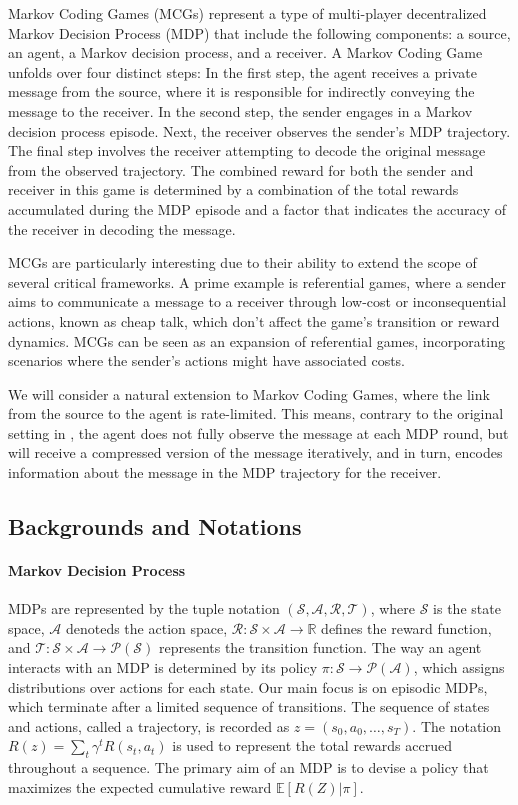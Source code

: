 Markov Coding Games (MCGs) \cite{sokota2022communicating} represent a type of multi-player decentralized Markov Decision Process (MDP) that include the following components: a source, an agent, a Markov decision process, and a receiver. A Markov Coding Game unfolds over four distinct steps:  In the first step, the agent receives a private message from the source, where it is responsible for indirectly conveying the message to the receiver. In the second step, the sender engages in a Markov decision process episode. Next, the receiver observes the sender’s MDP trajectory. The final step involves the receiver attempting to decode the original message from the observed trajectory. The combined reward for both the sender and receiver in this game is determined by a combination of the total rewards accumulated during the MDP episode and a factor that indicates the accuracy of the receiver in decoding the message.

MCGs are particularly interesting due to their ability to extend the scope of several critical frameworks. A prime example is referential games, where a sender aims to communicate a message to a receiver through low-cost or inconsequential actions, known as cheap talk, which don’t affect the game’s transition or reward dynamics. MCGs can be seen as an expansion of referential games, incorporating scenarios where the sender’s actions might have associated costs.

We will consider a natural extension to Markov Coding Games, where the link from the source to the agent is rate-limited. This means, contrary to the original setting in \cite{sokota2022communicating}, the agent does not fully observe the message at each MDP round, but will receive a compressed version of the message iteratively, and in turn, encodes information about the message in the MDP trajectory for the receiver.


\subsection{Backgrounds and Notations}
\paragraph{Markov Decision Process}  MDPs are represented by the tuple notation $(\mathcal{S}, \mathcal{A}, \mathcal{R}, \mathcal{T})$, where $\mathcal{S}$ is the state space, $\mathcal{A}$ denoteds the action space, $\mathcal{R}: \mathcal{S} \times \mathcal{A} \rightarrow \mathbb{R}$ defines the reward function, and $\mathcal{T}: \mathcal{S} \times \mathcal{A} \rightarrow \mathcal{P}(\mathcal{S})$ represents the transition function. The way an agent interacts with an MDP is determined by its policy $\pi: \mathcal{S} \rightarrow \mathcal{P}(\mathcal{A})$, which assigns distributions over actions for each state. Our main focus is on episodic MDPs, which terminate after a limited sequence of transitions. The sequence of states and actions, called a trajectory, is recorded as $z = (s_0, a_0, \ldots, s_T)$. The notation $R(z) = \sum_t \gamma^t R(s_t, a_t)$ is used to represent the total rewards accrued throughout a sequence. The primary aim of an MDP is to devise a policy that maximizes the expected cumulative reward $\mathbb{E}[R(Z) | \pi]$.

